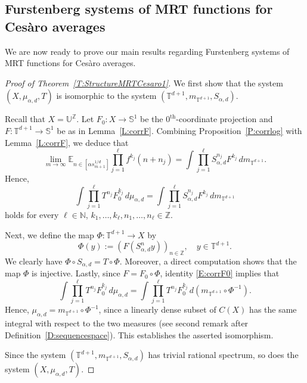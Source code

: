 \documentclass[11pt]{amsart}
\theoremstyle{definition}
\newcommand{\E}{{\mathbb E}}
\newcommand{\N}{{\mathbb N}}
\renewcommand{\S}{\mathbb{S}}
\newcommand{\T}{{\mathbb T}}
\newcommand{\Z}{{\mathbb Z}}
\newcommand{\U}{{\mathbb U}}
\begin{document}
 \subsection{Furstenberg systems  of MRT functions for  Ces\`aro averages} \label{SS:MRTCesaroProofs}
 We are now ready to prove our main results regarding Furstenberg systems of MRT functions for Ces\`aro averages.
 \begin{proof}[Proof of Theorem~\ref{T:StructureMRTCesaro1}]
We first show that the system	$(X,\mu_{\alpha,d},T)$ is isomorphic to the system   $(\T^{d+1},m_{\T^{d+1}},S_{\alpha,d})$.
 	
Recall that $X=\U^\Z$. Let $F_0\colon X\to \S^1$ be the $0^{\text{th}}$-coordinate projection and $F\colon \T^{d+1}\to \S^1$ be as in Lemma~\ref{L:corrF}.
Combining   Proposition~\ref{P:corrlog} with  Lemma~\ref{L:corrF}, we deduce that
$$
\lim_{m\to \infty} 	\E_{n\in[\alpha s_{m+1}^{1/d}]}\prod_{j=1}^\ell f^{k_j}(n+n_j)=\int \prod_{j=1}^\ell S_{\alpha,d}^{n_j}F^{k_j}\, dm_{\T^{d+1}}.
$$
Hence,
\begin{equation}\label{E:corrF0}
	\int \prod_{j=1}^\ell T^{n_j}F_0^{k_j}\, d\mu_{\alpha,d}=\int \prod_{j=1}^\ell S_{\alpha,d}^{n_j}F^{k_j}\, dm_{\T^{d+1}}
\end{equation}
holds for  every $\ell\in\N$, $k_1,\ldots, k_\ell, n_1,\ldots, n_\ell \in \Z$.

Next, we define the map $\Phi\colon \T^{d+1}\to X$ by
$$
\Phi(y):=(F(S_{\alpha,d}^ny))_{n\in\Z}, \quad y\in \T^{d+1}.
$$
We clearly have $\Phi\circ S_{\alpha,d}=T\circ \Phi$. Moreover, a direct computation shows that the map $\Phi$ is injective. Lastly, since $F=F_0\circ \Phi$, identity \eqref{E:corrF0} implies that
$$
	\int \prod_{j=1}^\ell T^{n_j}F_0^{k_j}\, d\mu_{\alpha,d}=\int \prod_{j=1}^\ell T^{n_j}F_0^{k_j}\, d(m_{\T^{d+1}}\circ \Phi^{-1}).
$$
Hence,  $\mu_{\alpha,d}=m_{\T^{d+1}}\circ \Phi^{-1}$, since a  linearly dense subset of $C(X)$ has the same integral with respect to the two measures (see second remark after Definition~\ref{D:sequencespace}). This establishes the asserted isomorphism.

Since the system $(\T^{d+1},m_{\T^{d+1}},S_{\alpha,d})$  has trivial rational spectrum,
 so does  the system $(X,\mu_{\alpha,d},T)$.



\end{proof}
\end{document}
